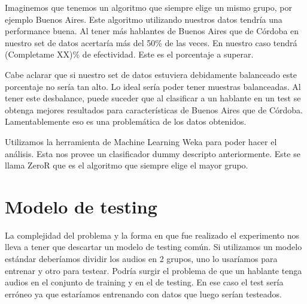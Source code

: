 \documentclass[11pt,a4paper,twoside]{tesis}
\begin{document}
Imaginemos que tenemos un algoritmo que siempre elige un mismo grupo, por ejemplo Buenos Aires. Este algoritmo utilizando nuestros datos tendría una performance buena. Al tener más hablantes de Buenos Aires que de Córdoba en nuestro set de datos acertaría más del 50\% de las veces. En nuestro caso tendrá (Completame XX)\% de efectividad. Este es el porcentaje a superar. 



Cabe aclarar que si nuestro set de datos estuviera debidamente balanceado este porcentaje no sería tan alto. Lo ideal sería poder tener muestras balanceadas. Al tener este desbalance, puede suceder que al clasificar a un hablante en un test se obtenga mejores resultados para características de Buenos Aires que de Córdoba. Lamentablemente eso es una problemática de los datos obtenidos.

Utilizamos la herramienta de Machine Learning Weka para poder hacer el análisis. Esta nos provee un clasificador dummy descripto anteriormente. Este se llama ZeroR que es el algoritmo que siempre elige el mayor grupo.

\section{Modelo de testing}

La complejidad del problema y la forma en que fue realizado el experimento nos lleva a tener que descartar un modelo de testing común. Si utilizamos un modelo estándar deberíamos dividir los audios en 2 grupos, uno lo usaríamos para entrenar y otro para testear. Podría surgir el problema de que un hablante tenga audios en el conjunto de training y en el de testing. En ese caso el test sería erróneo ya que estaríamos entrenando con datos que luego serían testeados.
\end{document}
